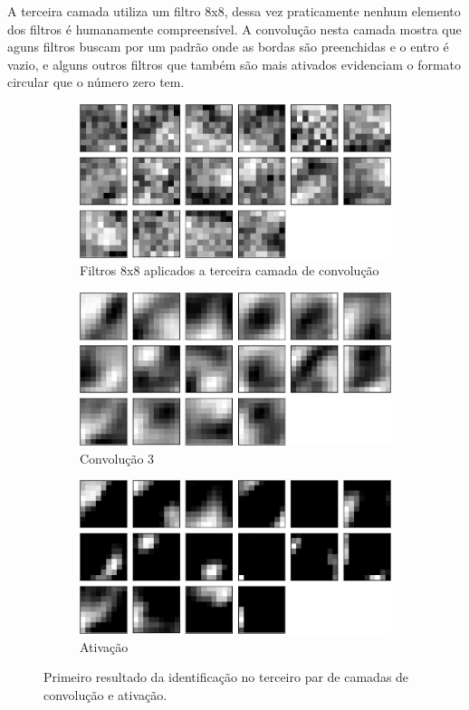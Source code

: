 \documentclass[
	12pt,				%
	oneside,			%
	a4paper,			%
	english,			%
	french,				%
	spanish,			%
	brazil,				%
	]{abntex2}
\begin{document}
\par A terceira camada utiliza um filtro 8x8, dessa vez praticamente nenhum elemento dos filtros é humanamente compreensível. A convolução nesta camada mostra que aguns filtros buscam por um padrão onde as bordas são preenchidas e o entro é vazio, e alguns outros filtros que também são mais ativados evidenciam o formato circular que o número zero tem.
\begin{center}
\begin{figure}[H]
	\begin{subfigure}{.8\textwidth}
		\centering
		\includegraphics[width=.6\linewidth]{images/fabio/resultados/network_3/filter_convolution2d_3}%
		\caption{Filtros 8x8 aplicados a terceira camada de convolução}		
		\label{fig:filtros8x8}	
	\end{subfigure}%
	
	\begin{subfigure}{.8\textwidth}
		\centering
		\includegraphics[width=.6\linewidth]{images/fabio/resultados/network_3/input_1_layer_convolution2d_3}
		\caption{Convolução 3}
	\end{subfigure}%
	
	\begin{subfigure}{.8\textwidth}
		\centering
		\includegraphics[width=.6\linewidth]{images/fabio/resultados/network_3/input_1_layer_activation_3}%
		\caption{Ativação}			
	\end{subfigure}%
	\caption{Primeiro resultado da identificação no terceiro par de camadas de convolução e ativação.}
		\label{fig:camada_3}
\end{figure}
\end{center}
\end{document}
